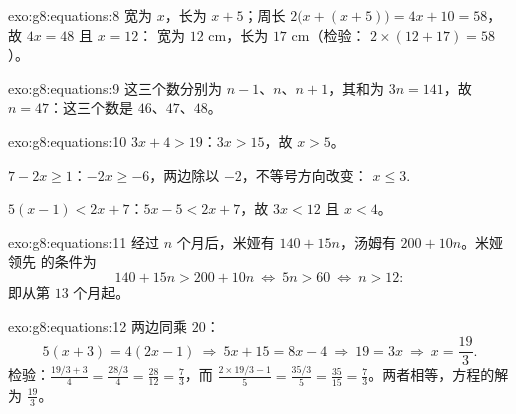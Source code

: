 \begin{solution}{exo:g8:equations:8}
宽为 $x$，长为 $x + 5$；周长 
$2\bigl(x + (x + 5)\bigr) = 4x + 10 = 58$，故 $4x = 48$ 且 $x = 12$：
宽为 $12$ cm，长为 $17$ cm（检验：
$2 \times (12 + 17) = 58$）。
\end{solution}

\begin{solution}{exo:g8:equations:9}
这三个数分别为 $n - 1$、$n$、$n + 1$，其和为 $3n = 141$，故
$n = 47$：这三个数是 $46$、$47$、$48$。
\end{solution}

\begin{solution}{exo:g8:equations:10}
$3x + 4 > 19$：$3x > 15$，故 $x > 5$。

$7 - 2x \geq 1$：$-2x \geq -6$，两边除以 $-2$，不等号方向改变：
$x \leq 3$.

$5(x-1) < 2x + 7$：$5x - 5 < 2x + 7$，故 $3x < 12$ 且 $x < 4$。
\end{solution}

\begin{solution}{exo:g8:equations:11}
经过 $n$ 个月后，米娅有 $140 + 15n$，汤姆有 $200 + 10n$。米娅领先
的条件为
\[
140 + 15n > 200 + 10n
\ \Longleftrightarrow\
5n > 60
\ \Longleftrightarrow\
n > 12 :
\]
即从第 $13$ 个月起。
\end{solution}

\begin{solution}{exo:g8:equations:12}
两边同乘 $20$：
\[
5(x + 3) = 4(2x - 1)
\ \Longrightarrow\
5x + 15 = 8x - 4
\ \Longrightarrow\
19 = 3x
\ \Longrightarrow\
x = \frac{19}{3}.
\]
检验：$\frac{19/3 + 3}{4} = \frac{28/3}{4} = \frac{28}{12} =
\frac73$，而 $\frac{2 \times 19/3 - 1}{5} = \frac{35/3}{5} =
\frac{35}{15} = \frac73$。两者相等，方程的解为 $\frac{19}{3}$。
\end{solution}

